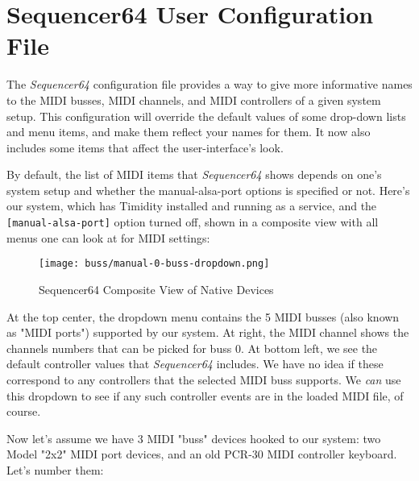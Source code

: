 %
%
%

\section{Sequencer64 User Configuration File}
\label{sec:seq64_usr_file}

   The \textsl{Sequencer64} configuration file provides a way to give more
   informative names to the MIDI busses, MIDI channels, and MIDI controllers of
   a given system setup.  This configuration will override the default values
   of some drop-down lists and menu items, and make them reflect your names for
   them.  It now also includes some items that affect the user-interface's
   look.

   By default, the list of MIDI items that \textsl{Sequencer64} shows depends
   on one's system setup and whether the manual-alsa-port options is specified
   or not.  Here's our system, which has Timidity installed and running as a
   service, and the \texttt{[manual-alsa-port]} option turned off, shown in a
   composite view with all menus one can look at for MIDI settings:

\begin{figure}[H]
   \centering 
   \texttt{[image: buss/manual-0-buss-dropdown.png]}
   \caption{Sequencer64 Composite View of Native Devices}
   \label{fig:seq64_manual_0_buss_dropdown}
\end{figure}

   At the top center, the dropdown menu contains the 5 MIDI busses (also known
   as "MIDI ports") supported by our system.  At right, the MIDI channel shows
   the channels numbers that can be picked for buss 0.  At bottom left, we see
   the default controller values that \textsl{Sequencer64} includes.  We have
   no idea if these correspond to any controllers that the selected MIDI buss
   supports.  We \textsl{can} use this dropdown to see if any such controller
   events are in the loaded MIDI file, of course.

   Now let's assume we have 3 MIDI "buss" devices hooked to our system:
   two Model "2x2" MIDI port devices, and an old PCR-30 MIDI controller
   keyboard.  Let's number them:

